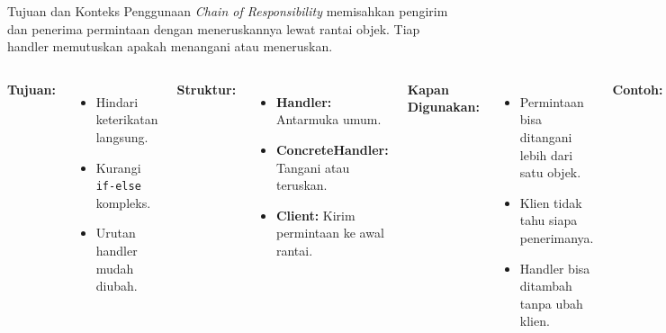 \documentclass[aspectratio=169, table]{beamer}
\begin{document}
\begin{frame}{Tujuan dan Konteks Penggunaan}
	\vspace{10pt}
	\textit{Chain of Responsibility} memisahkan pengirim dan penerima permintaan dengan meneruskannya lewat rantai objek. Tiap handler memutuskan apakah menangani atau meneruskan.
	\begin{columns}[T]
		\textbf{Tujuan:}
		\begin{itemize}
			\item Hindari keterikatan langsung.
			\item Kurangi \texttt{if-else} kompleks.
			\item Urutan handler mudah diubah.
		\end{itemize}
		
		\textbf{Struktur:}
		\begin{itemize}
			\item \textbf{Handler:} Antarmuka umum.
			\item \textbf{ConcreteHandler:} Tangani atau teruskan.
			\item \textbf{Client:} Kirim permintaan ke awal rantai.
		\end{itemize}
		
		\textbf{Kapan Digunakan:}
		\begin{itemize}
			\item Permintaan bisa ditangani lebih dari satu objek.
			\item Klien tidak tahu siapa penerimanya.
			\item Handler bisa ditambah tanpa ubah klien.
		\end{itemize}
		
		\textbf{Contoh:}
		\begin{itemize}
			\item Validasi bertingkat, Logging bertahap, Approval multi-level, Middleware web.
		\end{itemize}
	\end{columns}
\end{frame}
\end{document}
